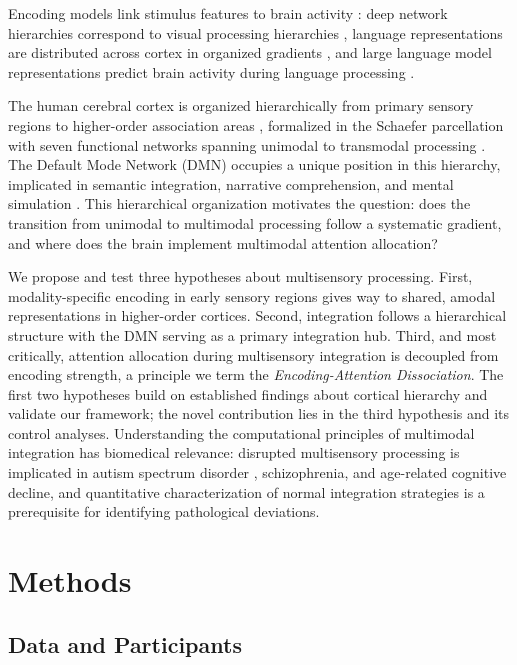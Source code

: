 \documentclass[conference]{IEEEtran}
\begin{document}
Encoding models link stimulus features to brain activity \cite{naselaris2011encoding}: deep network hierarchies correspond to visual processing hierarchies \cite{gucclu2015deep}, language representations are distributed across cortex in organized gradients \cite{huth2016natural}, and large language model representations predict brain activity during language processing \cite{caucheteux2022brains}.

The human cerebral cortex is organized hierarchically from primary sensory regions to higher-order association areas \cite{margulies2016situating}, formalized in the Schaefer parcellation with seven functional networks spanning unimodal to transmodal processing \cite{schaefer2018local}. The Default Mode Network (DMN) occupies a unique position in this hierarchy, implicated in semantic integration, narrative comprehension, and mental simulation \cite{mar2011neural, simony2016dynamic}. This hierarchical organization motivates the question: does the transition from unimodal to multimodal processing follow a systematic gradient, and where does the brain implement multimodal attention allocation?

We propose and test three hypotheses about multisensory processing. First, modality-specific encoding in early sensory regions gives way to shared, amodal representations in higher-order cortices. Second, integration follows a hierarchical structure with the DMN serving as a primary integration hub. Third, and most critically, attention allocation during multisensory integration is decoupled from encoding strength, a principle we term the \textit{Encoding-Attention Dissociation}. The first two hypotheses build on established findings about cortical hierarchy \cite{margulies2016situating} and validate our framework; the novel contribution lies in the third hypothesis and its control analyses. Understanding the computational principles of multimodal integration has biomedical relevance: disrupted multisensory processing is implicated in autism spectrum disorder \cite{stevenson2014multisensory}, schizophrenia, and age-related cognitive decline, and quantitative characterization of normal integration strategies is a prerequisite for identifying pathological deviations.

\section{Methods}

\subsection{Data and Participants}
\end{document}

